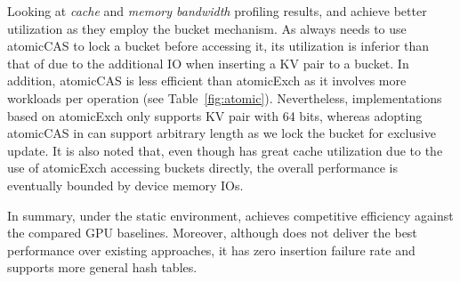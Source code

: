 Looking at \emph{cache} and \emph{memory bandwidth} profiling results, \megakv and \voter achieve better utilization as they employ the bucket mechanism.
As \voter always needs to use atomicCAS to lock a bucket before accessing it, its utilization is inferior than that of \megakv due to the additional IO when inserting a KV pair to a bucket. In addition, atomicCAS is less efficient than atomicExch as it involves more workloads per operation (see Table~\ref{fig:atomic}). Nevertheless, implementations based on atomicExch only supports KV pair with 64 bits, whereas adopting atomicCAS in \voter can support arbitrary length as we lock the bucket for exclusive update.
It is also noted that, even though \megakv has great cache utilization due to the use of atomicExch accessing buckets directly, the overall performance is eventually bounded by device memory IOs. 

In summary, under the static environment, \voter achieves competitive efficiency against the compared GPU baselines. Moreover, although \voter does not deliver the best performance over existing approaches, it has zero insertion failure rate and supports more general hash tables.

